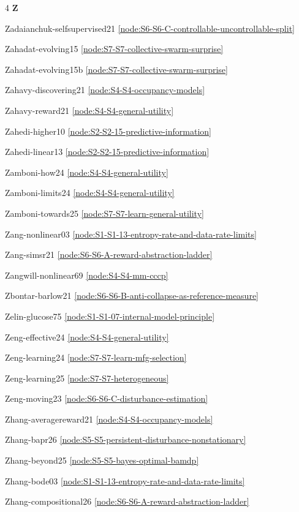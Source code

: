 \documentclass[10pt]{article}
\begin{document}
{\begin{multicols}{4}
\smallskip\textbf{Z}\par
Zadaianchuk-selfsupervised21 \hfill \ref{node:S6-S6-C-controllable-uncontrollable-split}\par
Zahadat-evolving15 \hfill \ref{node:S7-S7-collective-swarm-surprise}\par
Zahadat-evolving15b \hfill \ref{node:S7-S7-collective-swarm-surprise}\par
Zahavy-discovering21 \hfill \ref{node:S4-S4-occupancy-models}\par
Zahavy-reward21 \hfill \ref{node:S4-S4-general-utility}\par
Zahedi-higher10 \hfill \ref{node:S2-S2-15-predictive-information}\par
Zahedi-linear13 \hfill \ref{node:S2-S2-15-predictive-information}\par
Zamboni-how24 \hfill \ref{node:S4-S4-general-utility}\par
Zamboni-limits24 \hfill \ref{node:S4-S4-general-utility}\par
Zamboni-towards25 \hfill \ref{node:S7-S7-learn-general-utility}\par
Zang-nonlinear03 \hfill \ref{node:S1-S1-13-entropy-rate-and-data-rate-limits}\par
Zang-simsr21 \hfill \ref{node:S6-S6-A-reward-abstraction-ladder}\par
Zangwill-nonlinear69 \hfill \ref{node:S4-S4-mm-cccp}\par
Zbontar-barlow21 \hfill \ref{node:S6-S6-B-anti-collapse-as-reference-measure}\par
Zelin-glucose75 \hfill \ref{node:S1-S1-07-internal-model-principle}\par
Zeng-effective24 \hfill \ref{node:S4-S4-general-utility}\par
Zeng-learning24 \hfill \ref{node:S7-S7-learn-mfg-selection}\par
Zeng-learning25 \hfill \ref{node:S7-S7-heterogeneous}\par
Zeng-moving23 \hfill \ref{node:S6-S6-C-disturbance-estimation}\par
Zhang-averagereward21 \hfill \ref{node:S4-S4-occupancy-models}\par
Zhang-bapr26 \hfill \ref{node:S5-S5-persistent-disturbance-nonstationary}\par
Zhang-beyond25 \hfill \ref{node:S5-S5-bayes-optimal-bamdp}\par
Zhang-bode03 \hfill \ref{node:S1-S1-13-entropy-rate-and-data-rate-limits}\par
Zhang-compositional26 \hfill \ref{node:S6-S6-A-reward-abstraction-ladder}\par

\end{multicols}}
\end{document}
